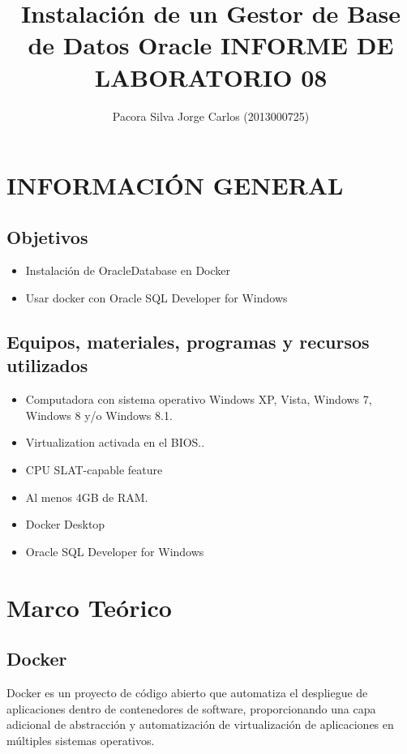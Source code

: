 \documentclass[preprint,12pt]{elsarticle}
\begin{document}
	
	\begin{frontmatter} 

		\title{\huge Instalación de un Gestor de Base de Datos Oracle INFORME DE LABORATORIO 08 }
		
		\author{Pacora Silva Jorge Carlos         	(2013000725)} 
		\address{Escuela Profesional de Ingeniería de Sistemas}
		\address{Universidad Privada de Tacna}
		\address{Tacna, Perú}
	\end{frontmatter}



\section{INFORMACIÓN GENERAL} 

\subsection {\textbf{Objetivos}}
\begin{itemize}
	\item Instalación de OracleDatabase en Docker
	\item Usar docker con  Oracle SQL Developer for Windows
\end{itemize}

\subsection {\textbf{Equipos, materiales, programas y recursos utilizados}}
\begin{itemize}
	\item Computadora con sistema operativo Windows XP, Vista, Windows 7, Windows 8 y/o Windows 8.1.
	\item Virtualization activada en el BIOS..
	\item CPU SLAT-capable feature
	\item Al menos 4GB de RAM.
	\item Docker Desktop 
	\item Oracle SQL Developer for Windows
\end{itemize}


\section{Marco Teórico}


\subsection {\textbf{Docker}}
Docker es un proyecto de código abierto que automatiza el despliegue de aplicaciones dentro de contenedores de software, proporcionando una capa adicional de abstracción y automatización de virtualización de aplicaciones en múltiples sistemas operativos.
\end{document}
